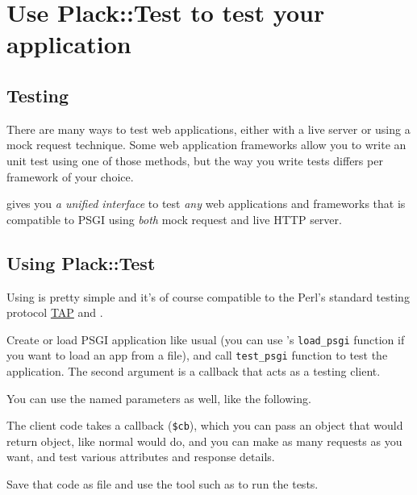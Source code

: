 \chapter{Use Plack::Test to test your application}
\label{day-13-use-placktest-to-test-your-application}

\section{Testing}\label{testing}

There are many ways to test web applications, either with a live server
or using a mock request technique. Some web application frameworks allow
you to write an unit test using one of those methods, but the way you
write tests differs per framework of your choice.

 gives you \emph{a unified interface} to test \emph{any} web
applications and frameworks that is compatible to PSGI using \emph{both}
mock request and live HTTP server.

\section{Using Plack::Test}\label{using-placktest}

Using  is pretty simple and it's of course compatible to the
Perl's standard testing protocol
\href{http://testanything.org/wiki/}{TAP} and
\href{http://search.cpan.org/perldoc?Test::More}{}.


Create or load PSGI application like usual (you can use
\href{http://search.cpan.org/perldoc?Plack::Util}{}'s
\lstinline!load_psgi! function if you want to load an app from a
 file), and call \lstinline!test_psgi! function to test
the application. The second argument is a callback that acts as a
testing client.

You can use the named parameters as well, like the following.


The client code takes a callback (\lstinline!$cb!), which you can pass
an  object that would return  object, like
normal  would do, and you can make as many requests as you
want, and test various attributes and response details.

Save that code as  file and use the tool such as
 to run the tests.

